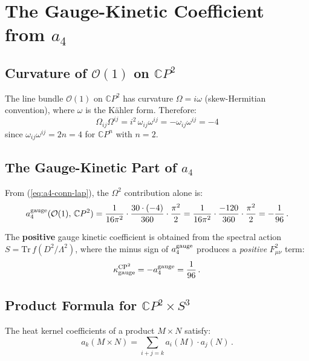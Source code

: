 \documentclass[12pt,a4paper]{article}
\theoremstyle{definition}
\begin{document}
\section{The Gauge-Kinetic Coefficient from $a_4$}
\label{sec:gauge-kinetic}

\subsection{Curvature of $\mathcal{O}(1)$ on $\mathbb{C}P^2$}

The line bundle $\mathcal{O}(1)$ on $\mathbb{C}P^2$ has curvature
$\Omega = i\omega$ (skew-Hermitian convention), where $\omega$ is the
K\"ahler form.  Therefore:
\begin{equation}
\Omega_{ij}\Omega^{ij} = i^2\,\omega_{ij}\omega^{ij} = -\omega_{ij}\omega^{ij} = -4
\end{equation}
since $\omega_{ij}\omega^{ij} = 2n = 4$ for $\mathbb{C}P^n$ with $n = 2$.

\subsection{The Gauge-Kinetic Part of $a_4$}

From (\ref{eq:a4-conn-lap}), the $\Omega^2$ contribution alone is:
\begin{equation}\label{eq:a4-gauge}
a_4^{\rm gauge}(\mathcal{O}(1),\,\mathbb{C}P^2)
= \frac{1}{16\pi^2}\cdot\frac{30 \cdot (-4)}{360}\cdot\frac{\pi^2}{2}
= \frac{1}{16\pi^2}\cdot\frac{-120}{360}\cdot\frac{\pi^2}{2}
= -\frac{1}{96}\,.
\end{equation}

The \textbf{positive} gauge kinetic coefficient is obtained from the spectral
action $S = \mathrm{Tr}\,f(D^2/\Lambda^2)$, where the minus sign of $a_4^{\rm gauge}$
produces a \emph{positive} $F_{\mu\nu}^2$ term:
\begin{equation}
\kappa_{\rm gauge}^{\rm CP^2} = -a_4^{\rm gauge} = \frac{1}{96}\,.
\end{equation}

\subsection{Product Formula for $\mathbb{C}P^2 \times S^3$}

The heat kernel coefficients of a product $M \times N$ satisfy:
\begin{equation}
a_k(M \times N) = \sum_{i+j=k} a_i(M) \cdot a_j(N)\,.
\end{equation}
\end{document}
